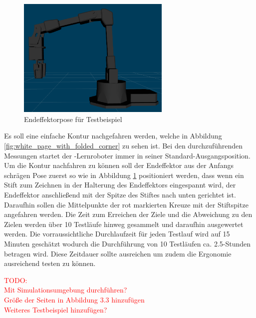 \begin{figure}[htb]
	\centering
	\includegraphics[width=0.65\textwidth]{images/loesungsweg/endeffektor_pose_2}
	\caption[Endeffektorpose für Testbeispiel]{Endeffektorpose für Testbeispiel}
	\label{fig:endeffektor_pose}
\end{figure}
\FloatBarrier

Es soll eine einfache Kontur nachgefahren werden, welche in Abbildung \ref{fig:white_page_with_folded_corner} zu sehen ist. Bei den durchzuführenden Messungen startet der -Lernroboter immer in seiner Standard-Ausgangsposition. Um die Kontur nachfahren zu können soll der Endeffektor aus der Anfangs schrägen Pose zuerst so wie in Abbildung \ref{fig:endeffektor_pose} positioniert werden, dass wenn ein Stift zum Zeichnen in der Halterung des Endeffektors eingespannt wird, der Endeffektor anschließend mit der Spitze des Stiftes nach unten gerichtet ist. Daraufhin sollen die Mittelpunkte der rot markierten Kreuze mit der Stiftspitze angefahren werden. Die Zeit zum Erreichen der Ziele und die Abweichung zu den Zielen werden über 10 Testläufe hinweg gesammelt und daraufhin ausgewertet werden. Die vorraussichtliche Durchlaufzeit für jeden Testlauf wird auf 15 Minuten geschätzt wodurch die Durchführung von 10 Testläufen ca. \num{2,5}-Stunden betragen wird. Diese Zeitdauer sollte ausreichen um zudem die Ergonomie ausreichend testen zu können.


\textcolor{red}{TODO:\\
Mit Simulationsumgebung durchführen?\\
Größe der Seiten in Abbildung 3.3 hinzufügen\\
Weiteres Testbeispiel hinzufügen?
}
